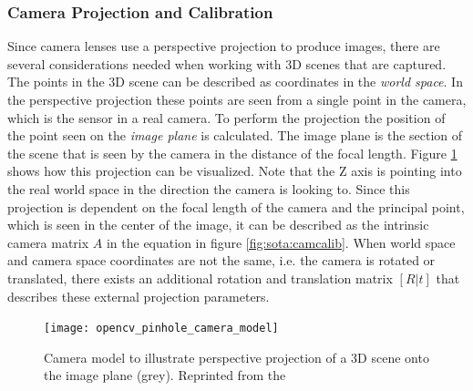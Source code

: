 \subsubsection{Camera Projection and Calibration}

Since camera lenses use a perspective projection to produce images, 
there are several considerations needed when working with \ac{3D} scenes that are captured.
The points in the 3D scene can be described as coordinates in the \emph{world space}.
In the perspective projection these points are seen from a single point in the camera, 
which is the sensor in a real camera.
To perform the projection the position of the point seen on the \emph{image plane} is calculated.
The image plane is the section of the scene that is seen by the camera in the distance of the focal length.
Figure \ref{fig:sota:camerprojection} shows how this projection can be visualized.
Note that the Z axis is pointing into the real world space in the direction the camera is looking to.
Since this projection is dependent on the focal length of the camera and the principal point, which is seen in the center of the image, it can be described as the intrinsic camera matrix $ A $ in the equation in figure \ref{fig:sota:camcalib}.
When world space and camera space coordinates are not the same, i.e. the camera is rotated or translated, there exists an additional rotation and translation matrix $ [R|t] $ that describes these external projection parameters.

\begin{figure}[hbt]
    \centering
    \texttt{[image: opencv\_pinhole\_camera\_model]}
        \caption[Camera model to illustrate perspective projection]{Camera model to illustrate perspective projection of a 3D scene onto the image plane (grey). Reprinted from the \textcite{opencv2018calibration}}
    \label{fig:sota:camerprojection}
\end{figure}

